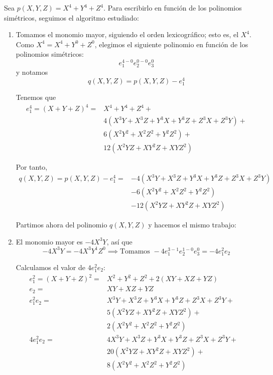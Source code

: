 \documentclass[a4paper, 11pt]{article}
\begin{document}
  \begin{solucion}
      Sea $p(X,Y,Z) = X^4 + Y^4 + Z^4$. Para escribirlo en función de los polinomios simétricos, seguimos el algoritmo estudiado:

      \begin{enumerate}
          \item Tomamos el monomio mayor, siguiendo el orden lexicográfico; esto es, el $X^4$.
          Como $X^4 = X^4 + Y^0 + Z^0$, elegimos el siguiente polinomio en función de los polinomios simétricos:
          \[
          e_1^{4-0}e_2^{0-0}e_3^0
          \]
          y notamos
          \[
          q(X,Y,Z) = p(X,Y,Z) - e_1^4
          \]

          Tenemos que
          \begin{align*}
              e_1^4 = (X+Y+Z)^4 = &X^4 + Y^4 + Z^4 +\\
                      &4(X^3Y + X^3Z + Y^3X + Y^3Z + Z^3X + Z^3Y) +\\
                      &6(X^2Y^2 + X^2Z^2 + Y^2Z^2) +\\
                      &12(X^2YZ + XY^2Z + XYZ^2)
          \end{align*}

          Por tanto,
          \begin{align*}
              q(X,Y,Z) = p(X,Y,Z) - e_1^4 = &-4(X^3Y + X^3Z + Y^3X + Y^3Z + Z^3X + Z^3Y)\\
                                            &-6(X^2Y^2 + X^2Z^2 + Y^2Z^2)\\
                                            &-12(X^2YZ + XY^2Z + XYZ^2)
          \end{align*}

          Partimos ahora del polinomio $q(X,Y,Z)$ y hacemos el mismo trabajo:

          \item El monomio mayor es $-4X^3Y$, así que
          \[
          -4X^3Y = -4X^3Y^1Z^0 \implies \textrm{Tomamos } -4e_1^{3-1}e_2^{1-0}e_3^0 = -4e_1^2e_2
          \]

          Calculamos el valor de $4e_1^2e_2$:
          \begin{align*}
              e_1^2 = (X+Y+Z)^2 = &X^2+Y^2+Z^2 + 2(XY+XZ+YZ)\\
              e_2               = &XY + XZ + YZ&\\
              e_1^2e_2          = &X^3Y + X^3Z + Y^3X + Y^3Z + Z^3X + Z^3Y +\\
                                  &5(X^2YZ + XY^2Z + XYZ^2) +\\
                                  &2(X^2Y^2 + X^2Z^2 + Y^2Z^2)\\
              4e_1^2e_2          = &4X^3Y + X^3Z + Y^3X + Y^3Z + Z^3X + Z^3Y +\\
                                  &20(X^2YZ + XY^2Z + XYZ^2) +\\
                                  &8(X^2Y^2 + X^2Z^2 + Y^2Z^2)
          \end{align*}


\end{enumerate}
\end{solucion}
\end{document}
